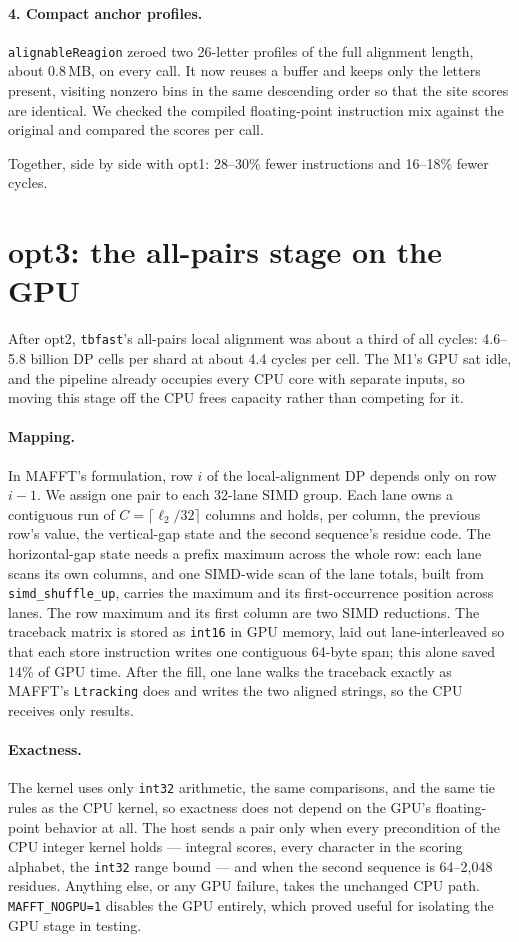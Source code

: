\documentclass[11pt]{article}
\newcommand{\code}[1]{\texttt{#1}}
\begin{document}
\paragraph{4. Compact anchor profiles.} \code{alignableReagion} zeroed two
26-letter profiles of the full alignment length, about 0.8\,MB, on every call. It now
reuses a buffer and keeps only the letters present, visiting nonzero bins in the same
descending order so that the site scores are identical. We checked the compiled floating-point
instruction mix against the original and compared the scores per call.

Together, side by side with opt1: 28--30\% fewer instructions and 16--18\% fewer cycles.

\section{opt3: the all-pairs stage on the GPU}
\label{sec:gpu}

After opt2, \code{tbfast}'s all-pairs local alignment was about a third of all cycles: 4.6--5.8
billion DP cells per shard at about 4.4 cycles per cell. The M1's GPU sat idle, and the
pipeline already occupies every CPU core with separate inputs, so moving this stage off
the CPU frees capacity rather than competing for it.

\paragraph{Mapping.} In MAFFT's formulation, row $i$ of the local-alignment DP depends only
on row $i{-}1$. We assign one pair to each 32-lane SIMD group. Each lane owns a contiguous
run of $C = \lceil \ell_2/32\rceil$ columns and holds, per column, the previous row's value,
the vertical-gap state and the second sequence's residue code. The horizontal-gap state
needs a prefix maximum across the whole row: each lane scans its own columns, and one
SIMD-wide scan of the lane totals, built from \code{simd\_shuffle\_up}, carries the maximum
and its first-occurrence position across lanes. The row maximum and its first column are
two SIMD reductions. The traceback matrix is stored as \code{int16} in GPU memory, laid out
lane-interleaved so that each store instruction writes one contiguous 64-byte span; this
alone saved 14\% of GPU time. After the fill, one lane walks the traceback exactly as
MAFFT's \code{Ltracking} does and writes the two aligned strings, so the CPU receives only
results.

\paragraph{Exactness.} The kernel uses only \code{int32} arithmetic, the same comparisons,
and the same tie rules as the CPU kernel, so exactness does not depend on the GPU's
floating-point behavior at all. The host sends a pair only when every precondition of the
CPU integer kernel holds --- integral scores, every character in the scoring alphabet,
the \code{int32} range bound --- and when the second sequence is 64--2{,}048 residues.
Anything else, or any GPU failure, takes the unchanged CPU path. \code{MAFFT\_NOGPU=1}
disables the GPU entirely, which proved useful for isolating the GPU stage in testing.
\end{document}
